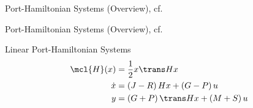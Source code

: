 \begin{frame}{Port-Hamiltonian Systems (Overview), cf.~\cite{VanDerSchaft2014}}
\end{frame}

\begin{frame}{Port-Hamiltonian Systems (Overview), cf.~\cite{VanDerSchaft2014}}
    \begin{block}{Linear Port-Hamiltonian Systems}
        \begin{align*}
            \mcl{H}(x) &= \frac{1}{2} x\trans H x \\
            \dot{x} &= \left( J - R \right) H x + \left( G - P \right) u \\
            y &= \left( G + P \right)\trans H x + \left( M + S \right) u
        \end{align*}
    \end{block}
\end{frame}

